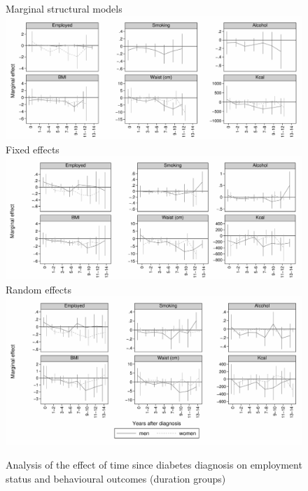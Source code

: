 \begin{figure}
\begin{center}
\caption{\label{fig:duration_g_fe_mi} Analysis of the effect of time since diabetes diagnosis on employment status and behavioural outcomes (duration groups)}
Marginal structural models
\includegraphics[width=\linewidth]{Chapter5/Figures/mi_msm_l_all1.pdf}
Fixed effects
\includegraphics[width=\linewidth]{Chapter5/Figures/mi_fe2.pdf}
Random effects
\includegraphics[width=\linewidth]{Chapter5/Figures/mi_re}
\end{center}
\end{figure}


